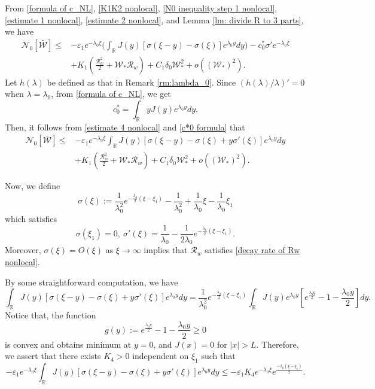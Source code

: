 \documentclass[11pt,a4paper]{article}
\numberwithin{equation}{section}
\numberwithin{figure}{section}
\begin{document}
From \eqref{formula of c_NL}, \eqref{K1K2 nonlocal}, \eqref{N0 inequality step 1 nonlocal}, \eqref{estimate 1 nonlocal}, \eqref{estimate 2 nonlocal}, and Lemma \ref{lm: divide R to 3 parts}, we have
\begin{equation}\label{estimate 4 nonlocal}
\begin{aligned}
\mathcal{N}_0[\bar{\mathcal{W}}]\le &-\varepsilon_1e^{-\lambda_0\xi}\Big(\int_{\mathbb{R}}J(y)[\sigma(\xi-y)-\sigma(\xi)] e^{\lambda_0y}dy\Big)-c^*_0\sigma'e^{-\lambda_0\xi}\\
&+K_1(\frac{\mathcal{R}_w^2}{2}+\mathcal{W}_*\mathcal{R}_w)+C_1\delta_0\mathcal{W}_*^2+o((\mathcal{W}_*)^2).
\end{aligned}
\end{equation}
Let $h(\lambda)$ be defined as that in Remark \ref{rm:lambda_0}. Since $(h(\lambda)/\lambda)'=0$ when $\lambda=\lambda_0$, from \eqref{formula of c_NL}, we get
\begin{equation}\label{c*0 formula}
c^*_0=\int_{\mathbb{R}}yJ(y)e^{\lambda_0y}dy.
\end{equation}
Then, it follows from \eqref{estimate 4 nonlocal} and \eqref{c*0 formula} that
\begin{equation}\label{estimate 3 nonlocal}
\begin{aligned}
\mathcal{N}_0[\bar{\mathcal{W}}]\le &-\varepsilon_1e^{-\lambda_0\xi}\int_{\mathbb{R}}J(y)[\sigma(\xi-y)-\sigma(\xi)+y\sigma'(\xi)] e^{\lambda_0y}dy\\
&+K_1(\frac{\mathcal{R}_w^2}{2}+\mathcal{W}_*\mathcal{R}_w)+C_1\delta_0\mathcal{W}_*^2+o((\mathcal{W}_*)^2).
\end{aligned}
\end{equation}

Now, we define
$$\sigma(\xi):=\frac{1}{\lambda_0^2}e^{-\frac{\lambda_0}{2}(\xi-\xi_1)}-\frac{1}{\lambda_0^2}+\frac{1}{\lambda_0}\xi-\frac{1}{\lambda_0}\xi_1$$
which satisfies 
$$\sigma(\xi_1)=0,\ \sigma'(\xi)=\frac{1}{\lambda_0}-\frac{1}{2\lambda_0}e^{-\frac{\lambda_0}{2}(\xi-\xi_1)}.$$
 Moreover, $\sigma(\xi)= O(\xi)$ as $\xi\to\infty$ implies that $\mathcal{R}_w$ satisfies \eqref{decay rate of Rw nonlocal}.

By some straightforward computation, we have
\begin{equation*}
\int_{\mathbb{R}}J(y)[\sigma(\xi-y)-\sigma(\xi)+y\sigma'(\xi)] e^{\lambda_0y}dy=\frac{1}{\lambda_0^2}e^{-\frac{\lambda_0}{2}(\xi-\xi_1)}\int_{\mathbb{R}}J(y)e^{\lambda_0 y}[e^{\frac{\lambda_0y}{2}}-1-\frac{\lambda_0y}{2}]dy.
\end{equation*}
Notice that, the function 
$$g(y):=e^{\frac{\lambda_0y}{2}}-1-\frac{\lambda_0y}{2}\ge 0$$
 is convex and obtains minimum at $y=0$, and $J(x)=0$ for $|x|>L$. Therefore, we assert that there exists $K_4>0$ independent on $\xi_1$ such that
\begin{equation}\label{estimate K4 nonlocal}
-\varepsilon_1e^{-\lambda_0\xi}\int_{\mathbb{R}}J(y)[\sigma(\xi-y)-\sigma(\xi)+y\sigma'(\xi)] e^{\lambda_0y}dy\le -\varepsilon_1K_4e^{-\lambda_0\xi}e^{\frac{-\lambda_0(\xi-\xi_1)}{2}}.
\end{equation}
\end{document}
